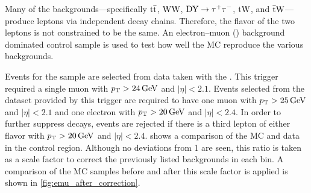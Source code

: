 Many of the backgrounds---specifically $\text{t} \overline{\text{t}}$, $\text{W} \text{W}$, $\text{DY} \to \tau^{+} \tau^{-}$, $\text{t} \text{W}$,
and $\overline{\text{t}} \text{W}$---produce leptons via independent decay chains. Therefore, the
flavor of the two leptons is not constrained to be the same. An electron--muon
(\emu) background dominated control sample is used to test how well the MC
reproduce the various backgrounds.

Events for the \emu sample are selected from data taken with the
\SingleMuonTrigger. This trigger required a single muon with $\pt >
\SI{24}{\GeV}$ and $|\eta| < 2.1$. Events selected from the dataset provided by
this trigger are required to have one muon with $\pt > \SI{25}{\GeV}$ and
$|\eta| < 2.1$ and one electron with $\pt > \SI{20}{\GeV}$ and $|\eta| < 2.4$.
In order to further suppress \Z decays, events are rejected if there is a third
lepton of either flavor with $\pt > \SI{20}{\GeV}$ and $|\eta| < 2.4$.
 shows a comparison of the MC and data in the
control region. Although no deviations from \num{1} are seen, this ratio is
taken as a scale factor to correct the previously listed backgrounds in each
bin. A comparison of the \Ztomumu MC samples before and after this scale factor
is applied is shown in \cref{fig:emu_after_correction}.

